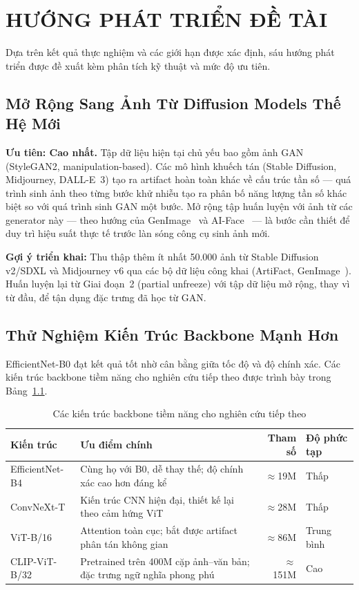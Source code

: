 \chapter{HƯỚNG PHÁT TRIỂN ĐỀ TÀI}

Dựa trên kết quả thực nghiệm và các giới hạn được xác định, sáu hướng phát triển được đề xuất kèm phân tích kỹ thuật và mức độ ưu tiên.

\section{Mở Rộng Sang Ảnh Từ Diffusion Models Thế Hệ Mới}

\textbf{Ưu tiên: Cao nhất.} Tập dữ liệu hiện tại chủ yếu bao gồm ảnh GAN (StyleGAN2, manipulation-based). Các mô hình khuếch tán (Stable Diffusion, Midjourney, DALL-E~3) tạo ra artifact hoàn toàn khác về cấu trúc tần số --- quá trình sinh ảnh theo từng bước khử nhiễu tạo ra phân bố năng lượng tần số khác biệt so với quá trình sinh GAN một bước. Mở rộng tập huấn luyện với ảnh từ các generator này --- theo hướng của GenImage~\cite{zhu2023genimage} và AI-Face~\cite{lin2025aiface} --- là bước cần thiết để duy trì hiệu suất thực tế trước làn sóng công cụ sinh ảnh mới.

\textbf{Gợi ý triển khai:} Thu thập thêm ít nhất 50.000 ảnh từ Stable Diffusion v2/SDXL và Midjourney v6 qua các bộ dữ liệu công khai (ArtiFact, GenImage~\cite{zhu2023genimage}). Huấn luyện lại từ Giai đoạn~2 (partial unfreeze) với tập dữ liệu mở rộng, thay vì từ đầu, để tận dụng đặc trưng đã học từ GAN.

\section{Thử Nghiệm Kiến Trúc Backbone Mạnh Hơn}

EfficientNet-B0 đạt kết quả tốt nhờ cân bằng giữa tốc độ và độ chính xác. Các kiến trúc backbone tiềm năng cho nghiên cứu tiếp theo được trình bày trong Bảng~\ref{tab:future_backbones}.

\begin{table}[H]
  \centering
  \caption{Các kiến trúc backbone tiềm năng cho nghiên cứu tiếp theo}
  \label{tab:future_backbones}
  \begin{tabularx}{\linewidth}{lXrl}
    \toprule
    \textbf{Kiến trúc} & \textbf{Ưu điểm chính} & \textbf{Tham số} & \textbf{Độ phức tạp} \\
    \midrule
    EfficientNet-B4 & Cùng họ với B0, dễ thay thế; độ chính xác cao hơn đáng kể & $\approx$19M & Thấp \\
    ConvNeXt-T & Kiến trúc CNN hiện đại, thiết kế lại theo cảm hứng ViT & $\approx$28M & Thấp \\
    ViT-B/16 & Attention toàn cục; bắt được artifact phân tán không gian & $\approx$86M & Trung bình \\
    CLIP-ViT-B/32 & Pretrained trên 400M cặp ảnh--văn bản; đặc trưng ngữ nghĩa phong phú & $\approx$151M & Cao \\
    \bottomrule
  \end{tabularx}
\end{table}

